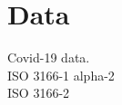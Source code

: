 \section{Data}

Covid-19 data\cite{DeBruin2020}. \\ 
ISO 3166-1 alpha-2 \cite{wiki:iso1}\\ 
ISO 3166-2 \cite{wiki:iso2}
